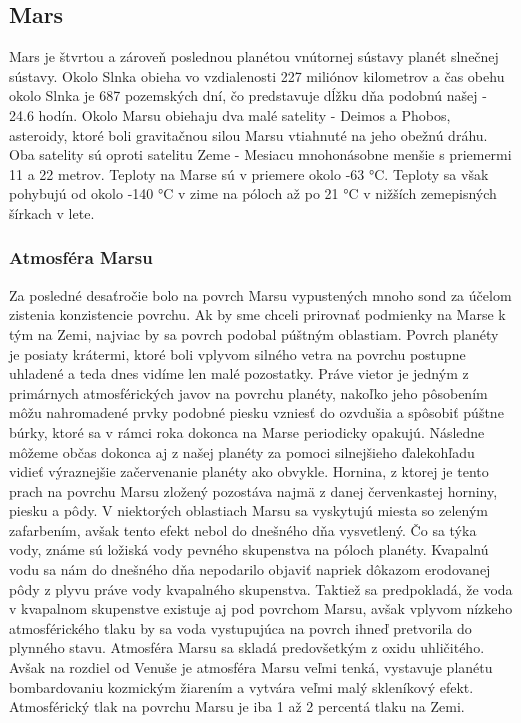 \subsection{Mars}
Mars je štvrtou a zároveň poslednou planétou vnútornej sústavy planét slnečnej sústavy. Okolo Slnka obieha vo vzdialenosti 227 miliónov kilometrov a čas obehu okolo Slnka je 687 pozemských dní, čo predstavuje dĺžku dňa podobnú našej - 24.6 hodín. Okolo Marsu obiehaju dva malé satelity - Deimos a Phobos, asteroidy, ktoré boli gravitačnou silou Marsu vtiahnuté na jeho obežnú dráhu. Oba satelity sú oproti satelitu Zeme - Mesiacu mnohonásobne menšie s priemermi 11 a 22 metrov. \cite{} Teploty na Marse sú v priemere okolo -63 °C. Teploty sa však pohybujú od okolo -140 °C v zime na póloch až po 21 °C v nižších zemepisných šírkach v lete.

\subsubsection{Atmosféra Marsu}
Za posledné desaťročie bolo na povrch Marsu vypustených mnoho sond za účelom zistenia konzistencie povrchu. Ak by sme chceli prirovnať podmienky na Marse k tým na Zemi, najviac by sa povrch podobal púštným oblastiam. Povrch planéty je posiaty krátermi, ktoré boli vplyvom silného vetra na povrchu postupne uhladené a teda dnes vidíme len malé pozostatky. Práve vietor je jedným z primárnych atmosférických javov na povrchu planéty, nakoľko jeho pôsobením môžu nahromadené prvky podobné piesku vzniesť do ozvdušia a spôsobiť púštne búrky, ktoré sa v rámci roka dokonca na Marse periodicky opakujú. Následne môžeme občas dokonca aj z našej planéty za pomoci silnejšieho ďalekohľadu vidieť výraznejšie začervenanie planéty ako obvykle. Hornina, z ktorej je tento prach na povrchu Marsu zložený pozostáva najmä z danej červenkastej horniny, piesku a pôdy. V niektorých oblastiach Marsu sa vyskytujú miesta so zeleným zafarbením, avšak tento efekt nebol do dnešného dňa vysvetlený. Čo sa týka vody, známe sú ložiská vody pevného skupenstva na póloch planéty. Kvapalnú vodu sa nám do dnešného dňa nepodarilo objaviť napriek dôkazom erodovanej pôdy z plyvu práve vody kvapalného skupenstva. Taktiež sa predpokladá, že voda v kvapalnom skupenstve existuje aj pod povrchom Marsu, avšak vplyvom nízkeho atmosférického tlaku by sa voda vystupujúca na povrch ihneď pretvorila do plynného stavu. 
Atmosféra Marsu sa skladá predovšetkým z oxidu uhličitého. Avšak na rozdiel od Venuše je atmosféra Marsu veľmi tenká, vystavuje planétu bombardovaniu kozmickým žiarením a vytvára veľmi malý skleníkový efekt. Atmosférický tlak na povrchu Marsu je iba 1 až 2 percentá tlaku na Zemi. 
